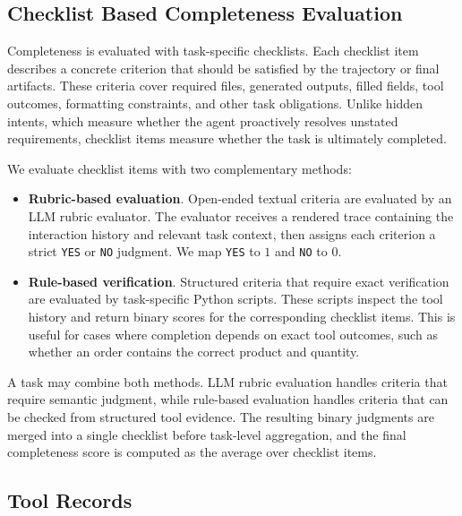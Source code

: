 \subsection{Checklist Based Completeness Evaluation}
\label{app:eval_completeness}

Completeness is evaluated with task-specific checklists. Each checklist item describes a concrete criterion that should be satisfied by the trajectory or final artifacts. These criteria cover required files, generated outputs, filled fields, tool outcomes, formatting constraints, and other task obligations. Unlike hidden intents, which measure whether the agent proactively resolves unstated requirements, checklist items measure whether the task is ultimately completed.

We evaluate checklist items with two complementary methods:
\begin{itemize}[leftmargin=10pt, topsep=0pt, itemsep=1pt, partopsep=1pt, parsep=1pt]
    \item \textbf{Rubric-based evaluation}. Open-ended textual criteria are evaluated by an LLM rubric evaluator. The evaluator receives a rendered trace containing the interaction history and relevant task context, then assigns each criterion a strict \texttt{YES} or \texttt{NO} judgment. We map \texttt{YES} to $1$ and \texttt{NO} to $0$.

    \item \textbf{Rule-based verification}. Structured criteria that require exact verification are evaluated by task-specific Python scripts. These scripts inspect the tool history and return binary scores for the corresponding checklist items. This is useful for cases where completion depends on exact tool outcomes, such as whether an order contains the correct product and quantity.
\end{itemize}

A task may combine both methods. LLM rubric evaluation handles criteria that require semantic judgment, while rule-based evaluation handles criteria that can be checked from structured tool evidence. The resulting binary judgments are merged into a single checklist before task-level aggregation, and the final completeness score is computed as the average over checklist items.

\subsection{Tool Records}
\label{app:eval_tool_records}

